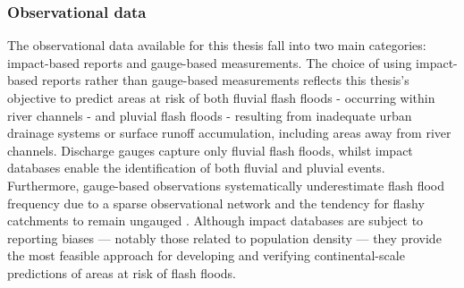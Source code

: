 \subsubsection{Observational data}

The  observational data available for this thesis fall into two main categories: impact-based reports and gauge-based measurements. The choice of using impact-based reports rather than gauge-based measurements reflects this thesis's objective to predict areas at risk of both fluvial flash floods - occurring within river channels - and pluvial flash floods - resulting from inadequate urban drainage systems or surface runoff accumulation, including areas away from river channels. Discharge gauges capture only fluvial flash floods, whilst impact databases enable the identification of both fluvial and pluvial events. Furthermore, gauge-based observations systematically underestimate flash flood frequency due to a sparse observational network and the tendency for flashy catchments to remain ungauged \citep{Gaume_2009, Gaume_2016}. Although impact databases are subject to reporting biases — notably those related to population density \citep{Marjerison_2016} — they provide the most feasible approach for developing and verifying continental-scale predictions of areas at risk of flash floods.


